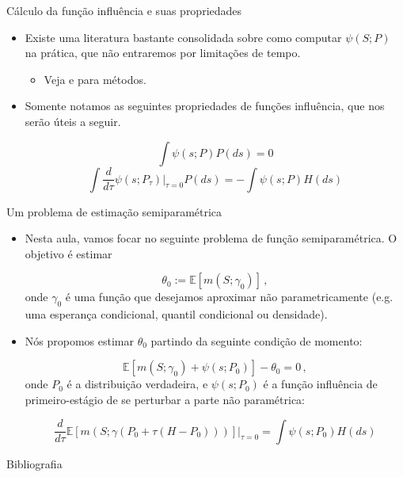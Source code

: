 \documentclass[11pt]{beamer}
\begin{document}
\begin{frame}{Cálculo da função influência e suas propriedades}
\begin{itemize}
	\item 	Existe uma literatura bastante consolidada sobre como computar $\psi(S;P)$ na prática, que não entraremos por limitações de tempo.
	\begin{itemize}
		\item Veja \citet{Ichimura2022} e \citet{kennedy2023semiparametric} para métodos.
	\end{itemize}
	\item Somente notamos as seguintes propriedades de funções influência, que nos serão úteis a seguir.
	
	$$\int \psi(s;P) P(ds) = 0$$
	$$\int \frac{d}{d \tau}\psi(s;P_\tau)\Big|_{\tau = 0} P(ds) = - \int \psi(s;P) H(ds) $$
\end{itemize}
\end{frame}

\begin{frame}{Um problema de estimação semiparamétrica}
\begin{itemize}
	\item Nesta aula, vamos focar no seguinte problema de função semiparamétrica. O objetivo é estimar
	
	$$\theta_0 := \mathbb{E}[m(S;\gamma_0)]\,,$$
	onde $\gamma_0$ é uma função que desejamos aproximar não parametricamente (e.g. uma esperança condicional, quantil condicional ou densidade).
	
	\item Nós propomos estimar $\theta_0$ partindo da seguinte condição de momento:
	
	$$ \mathbb{E}[m(S;\gamma_0) + \psi(s;P_0)] - \theta_0 = 0\,,$$
	onde $P_0$ é a distribuição verdadeira, e $\psi(s;P_0)$ é a {\color{blue}função influência de primeiro-estágio} de se perturbar a parte não paramétrica:
	
	$$\frac{d}{d \tau}\mathbb{E}[m(S;\gamma(P_0+\tau (H-P_0)))]\Big|_{\tau=0} = \int \psi(s;P_0)H(ds)$$
	
\end{itemize}
\end{frame}

\begin{frame}[allowframebreaks]{Bibliografia}
	\printbibliography
	
\end{frame}
\end{document}
